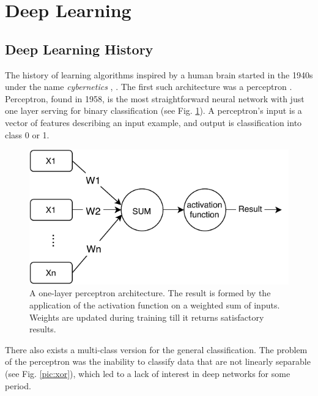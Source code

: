 \section{Deep Learning}

\subsection{Deep Learning History}
The history of learning algorithms inspired by a human brain started in the 1940s under the name \textit{cybernetics} \citep{Goodfellow-et-al-2016}, \citep{McCulloch}. The first such architecture was a perceptron \citep{Rosenblatt1958}.
Perceptron, found in 1958, is the most straightforward neural network with just one layer serving for binary classification (see Fig. \ref{pic:perceptron}). A perceptron's input is a vector of features describing an input example, and output is classification into class 0 or 1.

\begin{figure}[h]
\centering
\includegraphics[width=0.8\columnwidth]{../img/perceptron}
\caption{A one-layer perceptron architecture. The result is formed by the application of the activation function on a weighted sum of inputs. Weights are updated during training till it returns satisfactory results. }
\label{pic:perceptron}
\end{figure}

There also exists a multi-class version for the general classification. The problem of the perceptron was the inability to classify data that are not linearly separable \citep{Minsky2017} (see Fig. \ref{pic:xor}), which led to a lack of interest in deep networks for some period.

